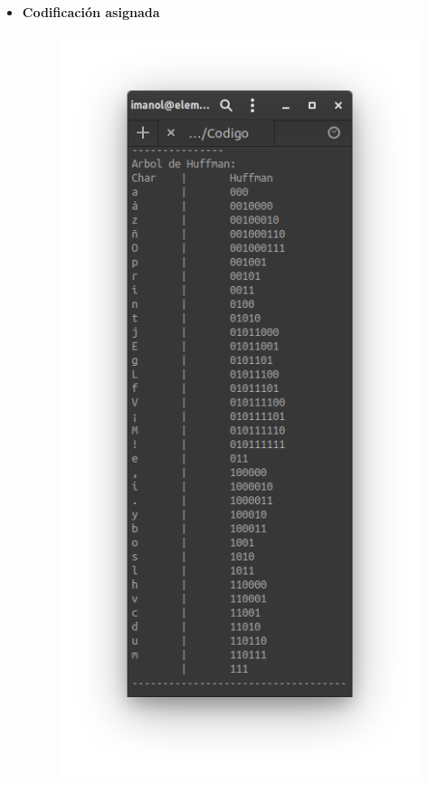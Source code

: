 \begin{itemize}
\begin{figure}[h!]
                \end{figure}
                \newpage
            \item \textbf{Codificación asignada} \\
                \begin{figure}[h!]
                    \centering
                    \includegraphics[scale=.5]{Huffman/ejemplos/ejemplo5/ej5-reph.png}
                \end{figure}
                \newpage
        \end{itemize}